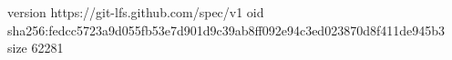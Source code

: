 version https://git-lfs.github.com/spec/v1
oid sha256:fedcc5723a9d055fb53e7d901d9c39ab8ff092e94c3ed023870d8f411de945b3
size 62281
